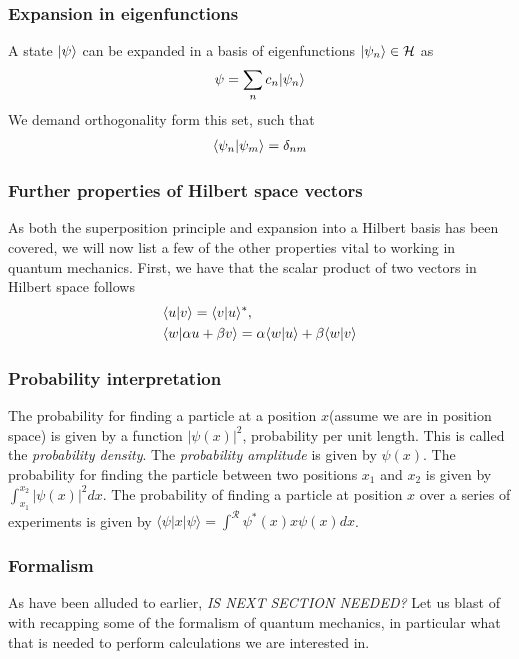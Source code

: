 \subsubsection{Expansion in eigenfunctions}
A state $|{\psi}\rangle$ can be expanded in a basis of eigenfunctions $|{\psi_n}\rangle \in \mathcal{H}$ as
\begin{align}
	\psi = \sum_n c_n |{\psi_n}\rangle
	\label{eq:eigenfunction-expansion}
\end{align}
We demand orthogonality form this set, such that 
\begin{align}
	\langle{\psi_n}|\psi_m\rangle = \delta_{nm}
	\label{eq:eig-func-orthogonality}
\end{align}

\subsubsection{Further properties of Hilbert space vectors}
As both the superposition principle and expansion into a Hilbert basis has been covered, we will now list a few of the other properties vital to working in quantum mechanics. First, we have that the scalar product of two vectors in Hilbert space follows
\begin{align}
	&\langle{u}|v\rangle = \langle{v}|u\rangle^*, \\
	&\langle{w}|\alpha u + \beta v \rangle = \alpha \langle{w}|u\rangle + \beta \langle{w}|v\rangle
\end{align}

\subsubsection{Probability interpretation}
The probability for finding a particle at a position $x$(assume we are in position space) is given by a function $|\psi(x)|^2$, probability per unit length. This is called the \textit{probability density}. The \textit{probability amplitude} is given by $\psi(x)$. The probability for finding the particle between two positions $x_1$ and $x_2$ is given by $\int^{x_2}_{x_1}|\psi(x)|^2dx$. The probability of finding a particle at position $x$ over a series of experiments is given by $\langle\psi|x|\psi\rangle = \int^\mathcal{R} \psi^*(x)x\psi(x)dx$.

\subsubsection{Formalism}
As have been alluded to earlier, 
\textit{IS NEXT SECTION NEEDED?}
Let us blast of with recapping some of the formalism of quantum mechanics, in particular what that is needed to perform calculations we are interested in.
